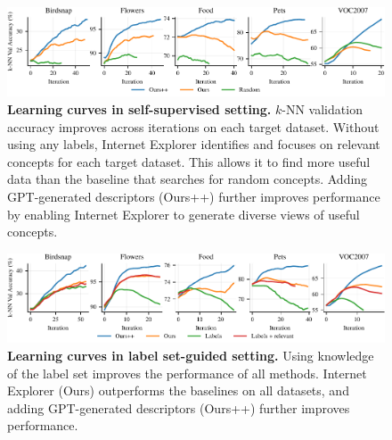 \begin{figure}[t]
    \centering
    \includegraphics[width=\linewidth]{figures/ssl-curves-updated.pdf}
    \caption{\textbf{Learning curves in self-supervised setting.} $k$-NN validation accuracy improves across iterations on each target dataset. Without using any labels, Internet Explorer identifies and focuses on relevant concepts for each target dataset. This allows it to find more useful data than the baseline that searches for random concepts. Adding GPT-generated descriptors (Ours++) further improves performance by enabling Internet Explorer to generate diverse views of useful concepts. 
    } 
    \label{fig:learning_curves}
\end{figure}

\begin{figure}[t]
    \centering
    \includegraphics[width=\linewidth]{figures/semisup-curves-updated.pdf}
    \vspace{-0.3in}
    \caption{\textbf{Learning curves in label set-guided setting.} Using knowledge of the label set improves the performance of all methods. Internet Explorer (Ours) outperforms the baselines on all datasets, and adding GPT-generated descriptors (Ours++) further improves performance.
    }
    \label{fig:semisup_learning_curves}
\end{figure}


